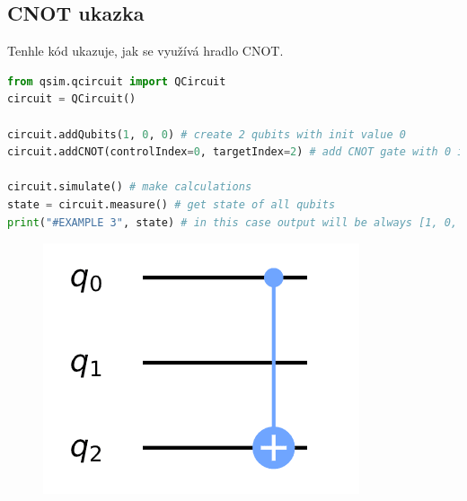 \documentclass[11pt]{article}
\begin{document}
\subsection{CNOT ukazka}
Tenhle kód ukazuje, jak se využívá hradlo CNOT.
\begin{lstlisting}[language=Python, caption=CNOT example]
from qsim.qcircuit import QCircuit
circuit = QCircuit()

circuit.addQubits(1, 0, 0) # create 2 qubits with init value 0
circuit.addCNOT(controlIndex=0, targetIndex=2) # add CNOT gate with 0 index qubit as control and 2 index as target

circuit.simulate() # make calculations
state = circuit.measure() # get state of all qubits
print("#EXAMPLE 3", state) # in this case output will be always [1, 0, 1]
\end{lstlisting}
\begin{figure}[H]
    \includegraphics[scale=.5]{cnot_scheme}
    \centering
\end{figure}
\end{document}
